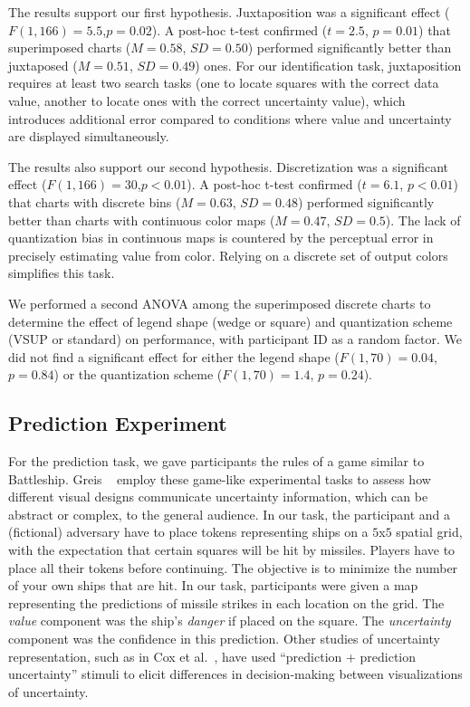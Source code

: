 The results support our first hypothesis. Juxtaposition was a significant effect ($F(1,166)=5.5$,$p=0.02$). A post-hoc t-test confirmed ($t=2.5$, $p=0.01$) that superimposed charts ($M=0.58$, $SD=0.50$) performed significantly better than juxtaposed ($M=0.51$, $SD=0.49$) ones. For our identification task, juxtaposition requires at least two search tasks (one to locate squares with the correct data value, another to locate ones with the correct uncertainty value), which introduces additional error compared to conditions where value and uncertainty are displayed simultaneously. 

The results also support our second hypothesis. Discretization was a significant effect ($F(1,166)=30$,$p<0.01$). A post-hoc t-test confirmed ($t=6.1$, $p<0.01$) that charts with discrete bins ($M=0.63$, $SD=0.48$) performed significantly better than charts with continuous color maps ($M=0.47$, $SD=0.5$). The lack of quantization bias in continuous maps is countered by the perceptual error in precisely estimating value from color. Relying on a discrete set of output colors simplifies this task.

We performed a second ANOVA among the superimposed discrete charts to determine the effect of legend shape (wedge or square) and quantization scheme (VSUP or standard) on performance, with participant ID as a random factor. We did not find a significant effect for either the legend shape ($F(1,70)=0.04$, $p=0.84$) or the quantization scheme ($F(1,70)=1.4$, $p=0.24$).

\subsection{Prediction Experiment}

\taskTwoFig

For the prediction task, we gave participants the rules of a game similar to Battleship. Greis \ea~\cite{greis2016decision} employ these game-like experimental tasks to assess how different visual designs communicate uncertainty information, which can be abstract or complex, to the general audience. In our task, the participant and a (fictional) adversary have to place tokens representing ships on a $5$x$5$ spatial grid, with the expectation that certain squares will be hit by missiles. Players have to place all their tokens before continuing. The objective is to minimize the number of your own ships that are hit. In our task, participants were given a map representing the predictions of missile strikes in each location on the grid. The \emph{value} component was the ship's \emph{danger} if placed on the square. The \emph{uncertainty} component was the confidence in this prediction. Other studies of uncertainty representation, such as in Cox et al.~\cite{cox2013visualizing}, have used ``prediction + prediction uncertainty'' stimuli to elicit differences in decision-making between visualizations of uncertainty.


